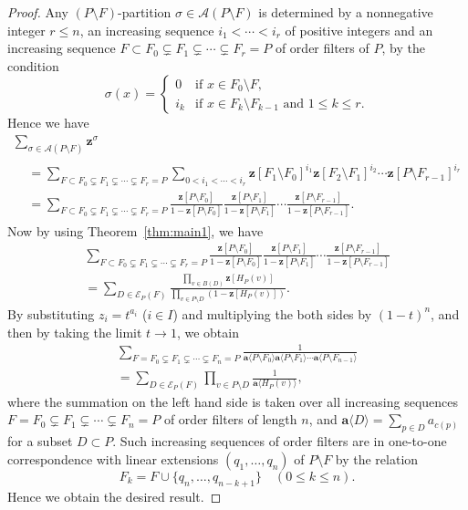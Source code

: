 \documentclass[ALCO,ThmDefs,Unicode,epreuves]{cedram}
\newcommand\vectz{\boldsymbol{z}}
\newcommand\vecta{\boldsymbol{a}}
\newcommand\AP{\mathcal{A}}
\newcommand\EE{\mathcal{E}}
\begin{document}
\begin{proof}
Any $(P \setminus F)$-partition $\sigma \in \AP(P \setminus F)$ is determined by 
a nonnegative integer $r\leq n$, an increasing sequence $i_1 < \cdots < i_r$ of positive integers 
and an increasing sequence $F \subset F_0 \subsetneq F_1 \subsetneq \cdots \subsetneq F_r = P$ 
of order filters of $P$, by the condition
$$
\sigma(x)
 =
\begin{cases}
 0 &\text{if $x \in F_0 \setminus F$,} \\
 i_k &\text{if $x \in F_k \setminus F_{k-1}$ and $1 \le k \le r$.}
\end{cases}
$$
Hence we have
\begin{multline*}
\sum_{\sigma \in \AP(P \setminus F)} \vectz^\sigma
\\
\begin{aligned}
&
=
\sum_{F \subset F_0 \subsetneq F_1 \subsetneq \cdots \subsetneq F_r = P}
\sum_{0 < i_1 < \cdots < i_r}
 \vectz[F_1 \setminus F_0]^{i_1} \vectz[F_2 \setminus F_1]^{i_2} \cdots \vectz[P \setminus F_{r-1}]^{i_r}
\\
&
=
\sum_{F \subset F_0 \subsetneq F_1 \subsetneq \cdots \subsetneq F_r = P}
 \frac{ \vectz[P \setminus F_0] }
 { 1 - \vectz[P \setminus F_0] }
 \frac{ \vectz[P \setminus F_1] }
 { 1 - \vectz[P \setminus F_1] }
 \cdots
 \frac{ \vectz[P \setminus F_{r-1}] }
 { 1 - \vectz[P \setminus F_{r-1}] }.
\end{aligned}
\end{multline*}
Now by using Theorem~\ref{thm:main1}, we have
\begin{multline*}
\sum_{F \subset F_0 \subsetneq F_1 \subsetneq \cdots \subsetneq F_r = P}
 \frac{ \vectz[P \setminus F_0] }
 { 1 - \vectz[P \setminus F_0] }
 \frac{ \vectz[P \setminus F_1] }
 { 1 - \vectz[P \setminus F_1] }
 \cdots
 \frac{ \vectz[P \setminus F_{r-1}] }
 { 1 - \vectz[P \setminus F_{r-1}] }
\\
 =
\sum_{D \in \EE_P(F)}
 \frac{ \prod_{v \in B(D)} \vectz[H_P(v)] }
 { \prod_{v \in P \setminus D} ( 1 - \vectz[H_P(v)] ) }.
\end{multline*}
By substituting $z_i = t^{a_i}$ ($i \in I$) and multiplying the both sides by $(1-t)^n$, 
and then by taking the limit $t \to 1$, we obtain
\begin{multline*}
\sum_{F = F_0 \subsetneq F_1 \subsetneq \cdots \subsetneq F_n = P}
 \frac{ 1 }
 { \vecta \langle P \setminus F_0 \rangle \vecta \langle P \setminus F_1 \rangle 
 \cdots \vecta \langle P \setminus F_{n-1} \rangle
 }
\\
 =
\sum_{D \in \EE_P(F)}
 \prod_{v \in P \setminus D}
 \frac{ 1 }
 { \vecta \langle H_P(v) \rangle },
\end{multline*}
where the summation on the left hand side is taken over all increasing sequences 
$F = F_0 \subsetneq F_1 \subsetneq \cdots \subsetneq F_n = P$ of order filters of length $n$, 
and $\vecta \langle D \rangle = \sum_{p \in D} a_{c(p)}$ for a subset $D \subset P$.
Such increasing sequences of order filters are in one-to-one correspondence 
with linear extensions $(q_1, \ldots, q_n)$ of $P \setminus F$ by the relation
$$
F_k = F \cup \{ q_n, \ldots, q_{n-k+1} \}
\quad(0 \le k \le n).
$$
Hence we obtain the desired result.
\end{proof}
\end{document}
